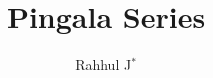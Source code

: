 \documentclass[journal,12pt,twocolumn]{IEEEtran}
\begin{document}
	\makeatletter
	\makeatother
	\let\StandardTheFigure\thefigure
	\renewcommand{\thefigure}{\theproblem}
	\def\putbox#1#2#3{\makebox[0in][l]{\makebox[#1][l]{}\raisebox{\baselineskip}[0in][0in]{\raisebox{#2}[0in][0in]{#3}}}}
	\def\rightbox#1{\makebox[0in][r]{#1}}
	\def\centbox#1{\makebox[0in]{#1}}
	\def\topbox#1{\raisebox{-\baselineskip}[0in][0in]{#1}}
	\def\midbox#1{\raisebox{-0.5\baselineskip}[0in][0in]{#1}}
	\vspace{3cm}
	\title{ 
		Pingala Series
	}
	\author{ Rahhul J$^{*}$ %
}
% 
%
\end{document}
